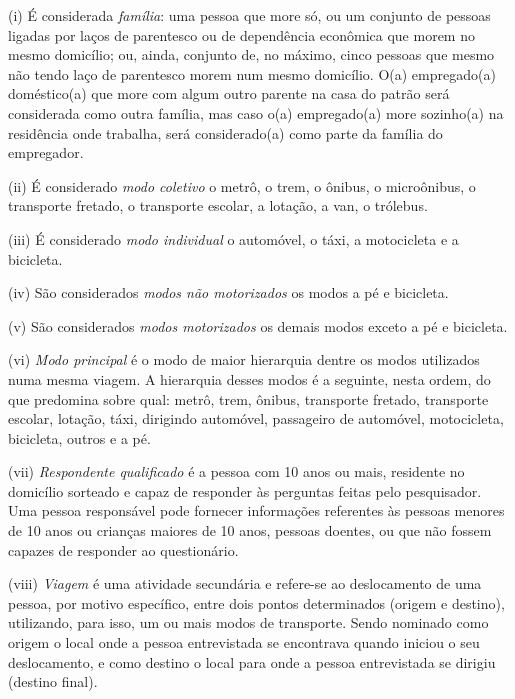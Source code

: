 \begin{compactitem}[]
\item (i) É considerada \emph{família}: uma pessoa que more só, ou um conjunto de pessoas ligadas por laços de parentesco ou de dependência econômica que morem no mesmo domicílio; ou, ainda, conjunto de, no máximo, cinco pessoas que mesmo não tendo laço de parentesco morem num mesmo domicílio. O(a) empregado(a) doméstico(a) que more com algum outro parente na casa do patrão será considerada como outra família, mas caso o(a) empregado(a) more sozinho(a) na residência onde trabalha, será considerado(a) como parte da família do empregador.

\item (ii) É considerado \emph{modo coletivo} o metrô, o trem, o ônibus, o microônibus, o transporte fretado, o transporte escolar, a lotação, a van, o trólebus.

\item (iii) É considerado \emph{modo individual} o automóvel, o táxi, a motocicleta e a bicicleta.

\item (iv) São considerados \emph{modos não motorizados} os modos a pé e bicicleta.

\item (v) São considerados \emph{modos motorizados} os demais modos exceto a pé e bicicleta.

\item (vi) \emph{Modo principal} é o modo de maior hierarquia dentre os modos utilizados numa mesma viagem. A hierarquia desses modos é a seguinte, nesta ordem, do que predomina sobre qual: metrô, trem, ônibus, transporte fretado, transporte escolar, lotação, táxi, dirigindo automóvel, passageiro de automóvel, motocicleta, bicicleta, outros e a pé.

\item (vii) \emph{Respondente qualificado} é a pessoa com 10 anos ou mais, residente no domicílio sorteado e capaz de responder às perguntas feitas pelo pesquisador. Uma pessoa responsável pode fornecer informações referentes às pessoas menores de 10 anos ou crianças maiores de 10 anos, pessoas doentes, ou que não fossem capazes de responder ao questionário.

\item (viii) \emph{Viagem} é uma atividade secundária e refere-se ao deslocamento de uma pessoa, por motivo específico, entre dois pontos determinados (origem e destino), utilizando, para isso, um ou mais modos de transporte. Sendo nominado como origem o local onde a pessoa entrevistada se encontrava quando iniciou o seu deslocamento, e como destino o local para onde a pessoa entrevistada se dirigiu (destino final).


\end{compactitem}
